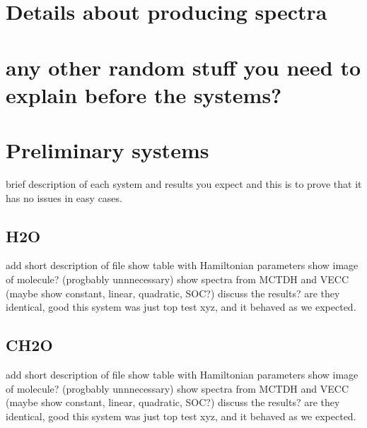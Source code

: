 \documentclass[letterpaper, 12pt, oneside]{report}
\begin{document}
\section{Details about producing spectra}

\section{any other random stuff you need to explain before the systems?}



\section{Preliminary systems}
brief description of each system and results you expect and this is to prove that it has no issues in easy cases.


\subsection{H2O}
add short description of file
show table with Hamiltonian parameters
show image of molecule? (progbably unnnecessary)
show spectra from MCTDH and VECC (maybe show constant, linear, quadratic, SOC?)
discuss the results? are they identical, good this system was just top test xyz, and it behaved as we expected.


\subsection{CH2O}
add short description of file
show table with Hamiltonian parameters
show image of molecule? (progbably unnnecessary)
show spectra from MCTDH and VECC (maybe show constant, linear, quadratic, SOC?)
discuss the results? are they identical, good this system was just top test xyz, and it behaved as we expected.
\end{document}
